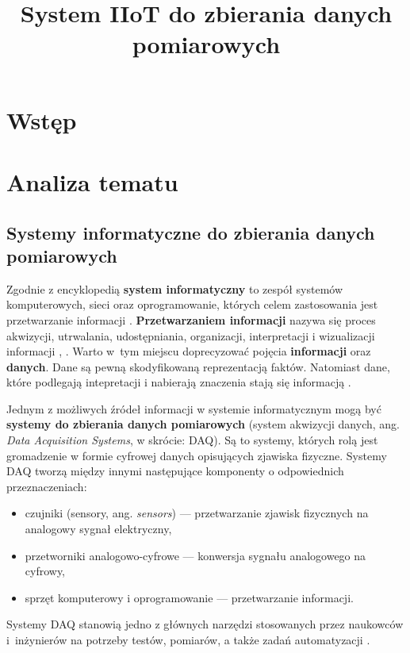 \documentclass[a4paper, 12pt, twoside]{article}
\title{System IIoT do zbierania danych pomiarowych}
\date{}
\begin{document}
\clearpage\maketitle %
\thispagestyle{empty}

\listoftodos

\newpage

\section{Wstęp}

\section{Analiza tematu}

\subsection{Systemy informatyczne do zbierania danych pomiarowych} \label{system-do-zbierania-danych}

Zgodnie z encyklopedią \textbf{system informatyczny} to zespół systemów komputerowych,
sieci oraz oprogramowanie, których celem zastosowania jest 
przetwarzanie informacji \cite{system-informatyczny}. 
\textbf{Przetwarzaniem informacji} nazywa się proces akwizycji, utrwalania, udostępniania,
organizacji, interpretacji i wizualizacji informacji \cite{information-science}, 
\cite{information-processing}. Warto w~tym miejscu doprecyzować pojęcia
\textbf{informacji} oraz \textbf{danych}. Dane są pewną skodyfikowaną reprezentacją
faktów. Natomiast dane, które podlegają intepretacji i nabierają znaczenia 
stają się informacją \cite{dane-informacja-wiedza}.

Jednym z możliwych źródeł informacji w systemie informatycznym mogą być 
\textbf{systemy do zbierania danych pomiarowych} (system akwizycji danych, ang. \emph{Data Acquisition Systems}, w skrócie: DAQ).
Są to systemy, których rolą jest gromadzenie w formie cyfrowej danych opisujących 
zjawiska fizyczne. Systemy DAQ tworzą między innymi następujące komponenty
o odpowiednich przeznaczeniach:
\begin{itemize}
    \itemsep0em 
    \item czujniki (sensory, ang. \emph{sensors}) --- przetwarzanie zjawisk fizycznych na analogowy sygnał elektryczny,
    \item przetworniki analogowo-cyfrowe --- konwersja sygnału analogowego na cyfrowy,
    \item sprzęt komputerowy i oprogramowanie --- przetwarzanie informacji. 
\end{itemize}
Systemy DAQ stanowią jedno z głównych narzędzi stosowanych przez naukowców i~inżynierów
na potrzeby testów, pomiarów, a także zadań automatyzacji \cite{data-aq-systems}.
\end{document}
